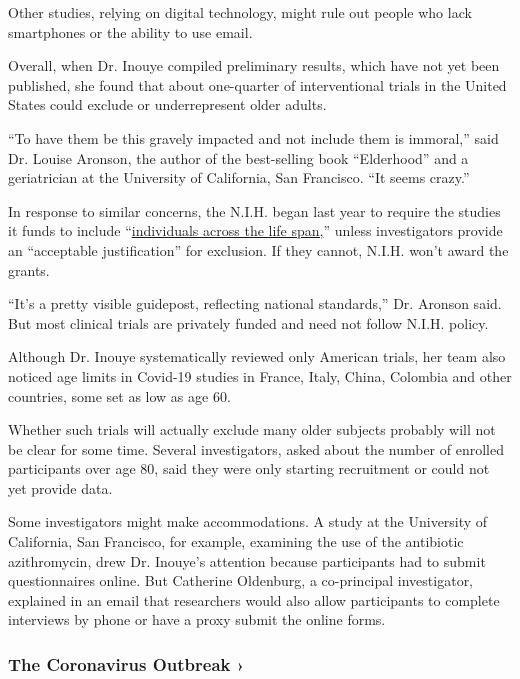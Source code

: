 Other studies, relying on digital technology, might rule out people who
lack smartphones or the ability to use email.

Overall, when Dr. Inouye compiled preliminary results, which have not
yet been published, she found that about one-quarter of interventional
trials in the United States could exclude or underrepresent older
adults.

``To have them be this gravely impacted and not include them is
immoral,'' said Dr. Louise Aronson, the author of the best-selling book
``Elderhood'' and a geriatrician at the University of California, San
Francisco. ``It seems crazy.''

In response to similar concerns, the N.I.H. began last year to require
the studies it funds to include
``\href{https://grants.nih.gov/grants/guide/notice-files/NOT-OD-18-116.html}{individuals
across the life span,}'' unless investigators provide an ``acceptable
justification'' for exclusion. If they cannot, N.I.H. won't award the
grants.

``It's a pretty visible guidepost, reflecting national standards,'' Dr.
Aronson said. But most clinical trials are privately funded and need not
follow N.I.H. policy.

Although Dr. Inouye systematically reviewed only American trials, her
team also noticed age limits in Covid-19 studies in France, Italy,
China, Colombia and other countries, some set as low as age 60.

Whether such trials will actually exclude many older subjects probably
will not be clear for some time. Several investigators, asked about the
number of enrolled participants over age 80, said they were only
starting recruitment or could not yet provide data.

Some investigators might make accommodations. A study at the University
of California, San Francisco, for example, examining the use of the
antibiotic azithromycin, drew Dr. Inouye's attention because
participants had to submit questionnaires online. But Catherine
Oldenburg, a co-principal investigator, explained in an email that
researchers would also allow participants to complete interviews by
phone or have a proxy submit the online forms.

\href{https://www.nytimes3xbfgragh.onion/news-event/coronavirus?action=click\&pgtype=Article\&state=default\&region=MAIN_CONTENT_3\&context=storylines_faq}{}

\hypertarget{the-coronavirus-outbreak-}{%
\subsubsection{The Coronavirus Outbreak
›}\label{the-coronavirus-outbreak-}}

